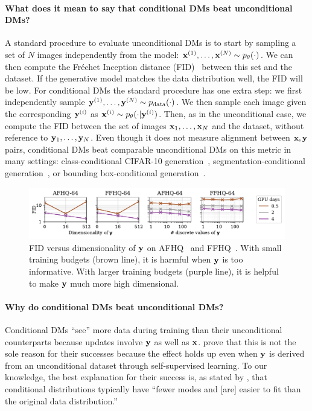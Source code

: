 \paragraph{What does it mean to say that conditional DMs beat unconditional DMs?} A standard procedure to evaluate unconditional DMs is to start by sampling a set of $N$ images independently from the model: ${{\mathbf{x}}^{(1)},\ldots,{\mathbf{x}}^{(N)} \sim p_\theta(\cdot)}$. We can then compute the Fr\'echet Inception distance (FID)~\citep{heusel2017gans} between this set and the dataset. If the generative model matches the data distribution well, the FID will be low.
%
For conditional DMs the standard procedure has one extra step: we first independently sample ${{\mathbf{y}}^{(1)},\ldots,{\mathbf{y}}^{(N)} \sim p_{\rm{data}}(\cdot)}$. We then sample each image given the corresponding ${\mathbf{y}}^{(i)}$ as ${{\mathbf{x}}^{(i)} \sim p_\theta(\cdot|{\mathbf{y}}^{(i)})}$. 
%
Then, as in the unconditional case, we compute the FID between the set of images ${\mathbf{x}}_1,\ldots,{\mathbf{x}}_N$ and the dataset, without reference to ${\mathbf{y}}_1,\ldots,{\mathbf{y}}_N$. Even though it does not measure alignment between ${\mathbf{x}}, {\mathbf{y}}$ pairs, conditional DMs beat comparable unconditional DMs on this metric in many settings: class-conditional CIFAR-10 generation~\citep{karras2022elucidating}, segmentation-conditional generation~\citep{hu2022self}, or bounding box-conditional generation~\citep{hu2022self}.

\begin{figure}[t]
    \centering
    \includegraphics[width=\textwidth]{figs/2sdm/cond-results-vs-nclusters.pdf}
    \caption{FID versus dimensionality of ${\mathbf{y}}$ on AFHQ~\citep{choi2020stargan} and FFHQ~\citep{karras2018style}. With small training budgets (brown line), it is harmful when ${\mathbf{y}}$ is too informative. With larger training budgets (purple line), it is helpful to make ${\mathbf{y}}$ much more high dimensional.}
    \label{fig:fid-vs-ncomp}
\end{figure}

\paragraph{Why do conditional DMs beat unconditional DMs?}

Conditional DMs ``see'' more data during training than their unconditional counterparts because updates involve ${\mathbf{y}}$ as well as ${\mathbf{x}}$. \citet{bao2022conditional,hu2022self} prove that this is not the sole reason for their successes because the effect holds up even when ${\mathbf{y}}$ is derived from an unconditional dataset through self-supervised learning.
%
To our knowledge, the best explanation for their success is, as stated by \citet{bao2022conditional}, that conditional distributions typically have ``fewer modes and [are] easier to fit than the original data distribution.''

